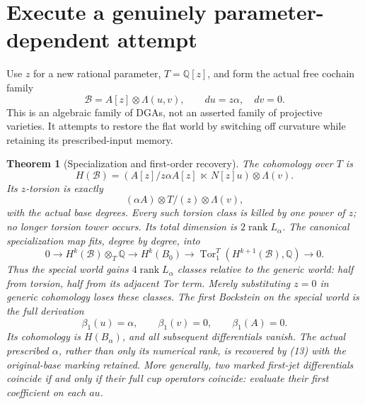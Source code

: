 \documentclass[11pt]{article}
\newtheorem{theorem}{Theorem}
\newcommand{\Q}{\mathbb Q}
\begin{document}
\section{Execute a genuinely parameter-dependent attempt}
Use $z$ for a new rational parameter, $T=\Q[z]$, and form the actual
free cochain family
\[
 \mathcal B=A[z]\otimes\Lambda(u,v),\qquad du=z\alpha,\quad dv=0.
                                                                    \tag{9}
\]
This is an algebraic family of DGAs, not an asserted family of projective
varieties. It attempts to restore the flat world by switching off curvature
while retaining its prescribed-input memory.
\begin{theorem}[Specialization and first-order recovery]\label{thm:family}
The cohomology over $T$ is
\[
 H(\mathcal B)=\left(A[z]/z\alpha A[z]\ \ltimes\ N[z]u\right)
                      \otimes\Lambda(v).                         \tag{10}
\]
Its $z$-torsion is exactly
\[
 (\alpha A)\otimes T/(z)\otimes\Lambda(v),                          \tag{11}
\]
with the actual base degrees. Every such torsion class is killed by one
power of $z$; no longer torsion tower occurs. Its total dimension is
$2\operatorname{rank}L_\alpha$.
The canonical specialization map fits, degree by degree, into
\[
 0\to H^k(\mathcal B)\otimes_T\Q
   \to H^k(B_0)
   \to \operatorname{Tor}_1^T(H^{k+1}(\mathcal B),\Q)\to0.        \tag{12}
\]
Thus the special world gains $4\operatorname{rank}L_\alpha$ classes
relative to the generic world: half from torsion, half from its adjacent
Tor term. Merely substituting $z=0$ in generic cohomology loses these
classes. The first Bockstein on the special world is the full derivation
\[
 \beta_1(u)=\alpha,\qquad\beta_1(v)=0,\qquad\beta_1(A)=0.        \tag{13}
\]
Its cohomology is $H(B_\alpha)$, and all subsequent differentials vanish.
The actual prescribed $\alpha$, rather than only its numerical rank,
is recovered by (13) with the original-base marking retained. More generally,
two marked first-jet differentials coincide if and only if their full
cup operators coincide: evaluate their first coefficient on each $au$.
\end{theorem}
\end{document}
